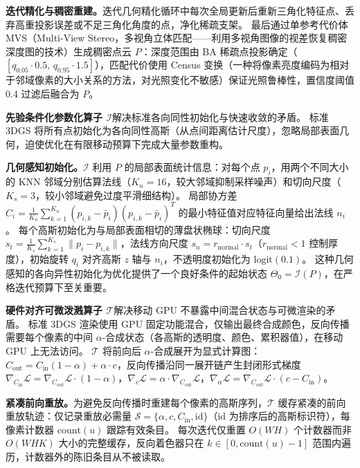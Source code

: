 \textbf{迭代精化与稠密重建。}迭代几何精化循环中每次全局更新后重新三角化特征点、丢弃高重投影误差或不足三角化角度的点，净化稀疏支架。
最后通过单参考代价体 MVS（Multi-View Stereo，多视角立体匹配——利用多视角图像的视差恢复稠密深度图的技术）生成稠密点云 $P$：深度范围由 BA 稀疏点投影确定（$[q_{0.05} \cdot 0.5,\, q_{0.95} \cdot 1.5]$），匹配代价使用 Census 变换（一种将像素亮度编码为相对于邻域像素的大小关系的方法，对光照变化不敏感）保证光照鲁棒性，置信度阈值 0.4 过滤后融合为 $P$。

\textbf{先验条件化参数化算子 $\mathcal{I}$}解决标准各向同性初始化与快速收敛的矛盾。
标准 3DGS 将所有点初始化为各向同性高斯（从点间距离估计尺度），忽略局部表面几何，迫使优化在有限移动预算下完成大量参数重构。

\textbf{几何感知初始化。}$\mathcal{I}$ 利用 $P$ 的局部表面统计信息：对每个点 $p_i$，用两个不同大小的 KNN 邻域分别估算法线（$K_n = 16$，较大邻域抑制采样噪声）和切向尺度（$K_s = 3$，较小邻域避免过度平滑细结构）。
局部协方差 $C_i = \frac{1}{K_n}\sum_{k=1}^{K_n}(p_{i,k} - \bar{p}_i)(p_{i,k} - \bar{p}_i)^T$ 的最小特征值对应特征向量给出法线 $n_i$。
每个高斯初始化为与局部表面相切的薄盘状椭球：切向尺度 $s_t = \frac{1}{K_s}\sum_{k=1}^{K_s}\|p_i - p_{i,k}\|$，法线方向尺度 $s_n = r_\text{normal} \cdot s_t$（$r_\text{normal} < 1$ 控制厚度），初始旋转 $q_i$ 对齐高斯 $z$ 轴与 $n_i$，不透明度初始化为 $\text{logit}(0.1)$。
这种几何感知的各向异性初始化为优化提供了一个良好条件的起始状态 $\Theta_0 = \mathcal{I}(P)$，在严格迭代预算下至关重要。

\textbf{硬件对齐可微泼溅算子 $\mathcal{T}$}解决移动 GPU 不暴露中间混合状态与可微渲染的矛盾。
标准 3DGS 渲染使用 GPU 固定功能混合，仅输出最终合成颜色，反向传播需要每个像素的中间 $\alpha$-合成状态（各高斯的透明度、颜色、累积器值），在移动 GPU 上无法访问。
$\mathcal{T}$ 将前向后 $\alpha$-合成展开为显式计算图：$C_\text{out} = C_\text{in}(1-\alpha) + \alpha \cdot c$，反向传播沿同一展开链产生封闭形式梯度 $\nabla_{C_\text{in}} \mathcal{L} = \nabla_{C_\text{out}} \mathcal{L} \cdot (1-\alpha)$，$\nabla_c \mathcal{L} = \alpha \cdot \nabla_{C_\text{out}} \mathcal{L}$，$\nabla_\alpha \mathcal{L} = \nabla_{C_\text{out}} \mathcal{L} \cdot (c - C_\text{in})$。

\textbf{紧凑前向重放。}为避免反向传播时重建每个像素的高斯序列，$\mathcal{T}$ 缓存紧凑的前向重放轨迹：仅记录重放必需量 $\mathcal{S} = \{\alpha, c, C_\text{in}, \text{id}\}$（$\text{id}$ 为排序后的高斯标识符），每像素计数器 $\text{count}(u)$ 跟踪有效条目。
每次迭代仅重置 $O(WH)$ 个计数器而非 $O(WHK)$ 大小的完整缓存，反向着色器只在 $k \in [0, \text{count}(u)-1]$ 范围内遍历，计数器外的陈旧条目从不被读取。

